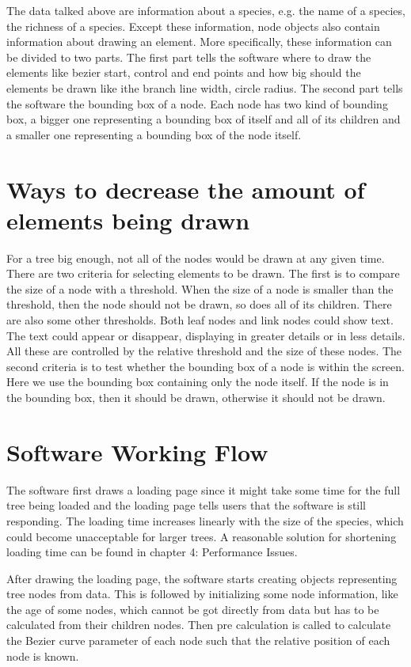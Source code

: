 \documentclass[MSc]{icldt}
\begin{document}
The data talked above are information about a species, e.g. the name of a species, the richness of a species. Except these information, node objects also contain information about drawing an element. More specifically, these information can be divided to two parts. The first part tells the software where to draw the elements like bezier start, control and end points and how big should the elements be drawn like ithe branch line width, circle radius. The second part tells the software the bounding box of a node. Each node has two kind of bounding box, a bigger one representing a bounding box of itself and all of its children and a smaller one representing a bounding box of the node itself. 


\section{Ways to decrease the amount of elements being drawn}

For a tree big enough, not all of the nodes would be drawn at any given time. There are two criteria for selecting elements to be drawn. The first is to compare the size of a node with a threshold. When the size of a node is smaller than the threshold, then the node should not be drawn, so does all of its children. There are also some other thresholds. Both leaf nodes and link nodes could show text. The text could appear or disappear, displaying in greater details or in less details. All these are controlled by the relative threshold and the size of these nodes. The second criteria is to test whether the bounding box of a node is within the screen. Here we use the bounding box containing only the node itself. If the node is in the bounding box, then it should be drawn, otherwise it should not be drawn. 

\section{Software Working Flow}

The software first draws a loading page since it might take some time for the full tree being loaded and the loading page tells users that the software is still responding. The loading time increases linearly with the size of the species, which could become unacceptable for larger trees. A reasonable solution for shortening loading time can be found in chapter 4: Performance Issues. 

After drawing the loading page, the software starts creating objects representing tree nodes from data. This is followed by initializing some node information, like the age of some nodes, which cannot be got directly from data but has to be calculated from their children nodes. Then pre calculation is called to calculate the Bezier curve parameter of each node such that the relative position of each node is known. 
\end{document}
